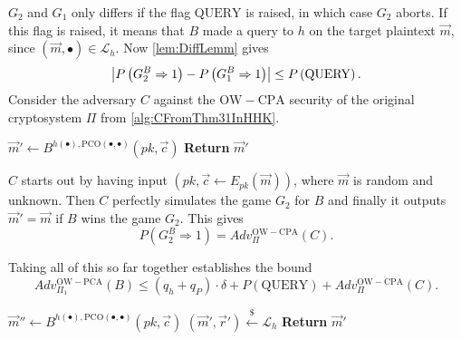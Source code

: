 $G_2$ and $G_1$ only differs if the flag $\mathrm{QUERY}$ is raised, in which case $G_2$ aborts. If this flag is raised, it means that $B$ made a query to $h$ on the target plaintext $\vec{m}$, since $\left(\vec{m}, \bullet\right) \in \mathcal{L}_{h}$. Now \cref{lem:DiffLemm} gives
\[
	\left\vert P\left( G_2^B \Rightarrow 1 \right) - P\left( G_1^B \Rightarrow 1 \right)  \right\vert \leq P\left(\mathrm{QUERY}\right).
\]
Consider the adversary $C$ against the $\mathrm{OW-CPA}$ security of the original cryptosystem $\Pi$ from \cref{alg:CFromThm31InHHK}.
\hfill
\begin{center}
	\begin{minipage}[ht!]{0.5\textwidth}
		\begin{algorithm}[H]
		\centering
		\caption{$C\left(pk, \vec{c}\right)$}
		\label{alg:CFromThm31InHHK}
			\begin{algorithmic}
				\State $\vec{m}' \leftarrow B^{h\left(\bullet\right), \mathrm{PCO}\left(\bullet, \bullet\right)}\left(pk, \vec{c}\right)$
				\State \textbf{Return} $\vec{m}'$
			\end{algorithmic}
		\end{algorithm}
	\end{minipage}
\end{center}
$C$ starts out by having input $\left(pk, \vec{c} \leftarrow E_{pk}\left(\vec{m}\right)\right)$, where $\vec{m}$ is random and unknown. Then $C$ perfectly simulates the game $G_2$ for $B$ and finally it outputs $\vec{m}' = \vec{m}$ if $B$ wins the game $G_2$. This gives
\[
	P\left( G_2^B \Rightarrow 1 \right) = Adv_{\Pi}^{\mathrm{OW-CPA}}\left(C\right).
\]

Taking all of this so far together establishes the bound
\[
	Adv_{\Pi_1}^{\mathrm{OW-PCA}}\left(B\right) \leq \left( q_{h} + q_{P} \right) \cdot \delta + P\left(\mathrm{QUERY}\right) + Adv_{\Pi}^{\mathrm{OW-CPA}}\left(C\right).
\]

\begin{center}
	\begin{minipage}[ht!]{0.5\textwidth}
		\begin{algorithm}[H]
			\centering
			\caption{$\mathrm{D}\left(pk, \vec{c}\right)$}
			\label{alg:DFromThm31InHHK}
			\begin{algorithmic}
				\State $\vec{m}'' \leftarrow B^{h\left(\bullet\right), \mathrm{PCO}\left(\bullet, \bullet\right)}\left(pk, \vec{c}\right)$
				\State $\left(\vec{m}', \vec{r}'\right) \xleftarrow{\$} \mathcal{L}_h$
				\State \textbf{Return} $\vec{m}'$
			\end{algorithmic}
		\end{algorithm}
	\end{minipage}
\end{center}

